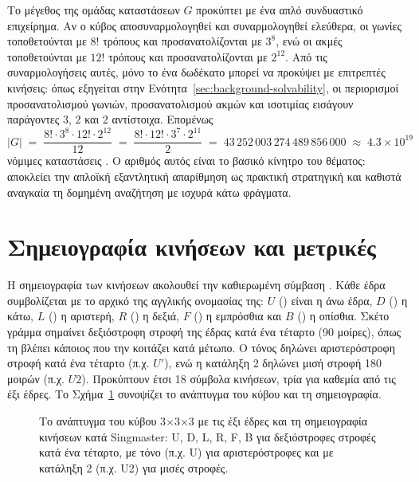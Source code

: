 Το μέγεθος της ομάδας καταστάσεων \(G\) προκύπτει με ένα απλό συνδυαστικό επιχείρημα. Αν ο κύβος αποσυναρμολογηθεί και συναρμολογηθεί ελεύθερα, οι γωνίες τοποθετούνται με \(8!\) τρόπους και προσανατολίζονται με \(3^{8}\), ενώ οι ακμές τοποθετούνται με \(12!\) τρόπους και προσανατολίζονται με \(2^{12}\). Από τις συναρμολογήσεις αυτές, μόνο το ένα δωδέκατο μπορεί να προκύψει με επιτρεπτές κινήσεις: όπως εξηγείται στην Ενότητα~\ref{sec:background-solvability}, οι περιορισμοί προσανατολισμού γωνιών, προσανατολισμού ακμών και ισοτιμίας εισάγουν παράγοντες 3, 2 και 2 αντίστοιχα. Επομένως
\[
|G| \;=\; \frac{8!\cdot 3^{8}\cdot 12!\cdot 2^{12}}{12}
    \;=\; \frac{8!\cdot 12!\cdot 3^{7}\cdot 2^{11}}{2}
    \;=\; 43\,252\,003\,274\,489\,856\,000 \;\approx\; 4.3\times 10^{19}
\]
νόμιμες καταστάσεις \cite{joyner2008adventures}. Ο αριθμός αυτός είναι το βασικό κίνητρο του θέματος: αποκλείει την απλοϊκή εξαντλητική απαρίθμηση ως πρακτική στρατηγική και καθιστά αναγκαία τη δομημένη αναζήτηση με ισχυρά κάτω φράγματα.

\section{Σημειογραφία κινήσεων και μετρικές}
\label{sec:background-notation}

Η σημειογραφία των κινήσεων ακολουθεί την καθιερωμένη σύμβαση  \cite{singmaster1981notes}. Κάθε έδρα συμβολίζεται με το αρχικό της αγγλικής ονομασίας της: \(U\) () είναι η άνω έδρα, \(D\) () η κάτω, \(L\) () η αριστερή, \(R\) () η δεξιά, \(F\) () η εμπρόσθια και \(B\) () η οπίσθια. Σκέτο γράμμα σημαίνει δεξιόστροφη στροφή της έδρας κατά ένα τέταρτο (90 μοίρες), όπως τη βλέπει κάποιος που την κοιτάζει κατά μέτωπο. Ο τόνος δηλώνει αριστερόστροφη στροφή κατά ένα τέταρτο (π.χ. \(U'\)), ενώ η κατάληξη 2 δηλώνει μισή στροφή 180 μοιρών (π.χ. \(U2\)). Προκύπτουν έτσι 18 σύμβολα κινήσεων, τρία για καθεμία από τις έξι έδρες. Το Σχήμα~\ref{fig:cube-notation} συνοψίζει το ανάπτυγμα του κύβου και τη σημειογραφία.

\begin{figure}[htbp]\centering

\caption{Το ανάπτυγμα του κύβου 3×3×3 με τις έξι έδρες και τη σημειογραφία κινήσεων κατά Singmaster: U, D, L, R, F, B για δεξιόστροφες στροφές κατά ένα τέταρτο, με τόνο (π.χ. U\textquotesingle) για αριστερόστροφες και με κατάληξη 2 (π.χ. U2) για μισές στροφές.}
\label{fig:cube-notation}
\end{figure}

